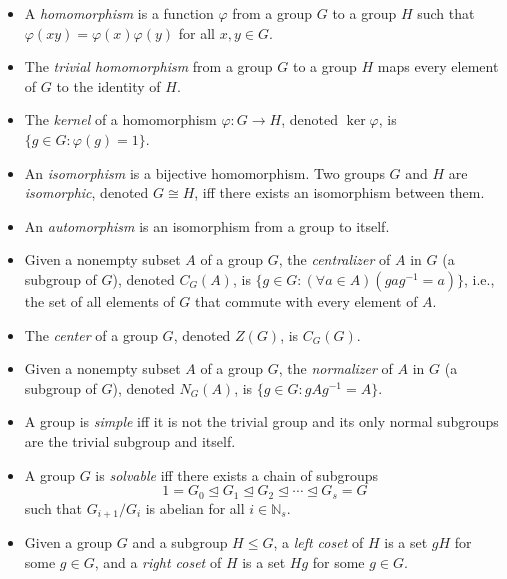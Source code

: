\documentclass{article}
\newcommand{\N}{\mathbb{N}}
\newcommand{\normaleq}{\trianglelefteq}
\begin{document}
\begin{itemize}
\item A \emph{homomorphism} is a function $\varphi$ from a group $G$ to a group $H$ such that $\varphi(xy) = \varphi(x)\varphi(y)$ for all $x,y\in G$.
\item The \emph{trivial homomorphism} from a group $G$ to a group $H$ maps every element of $G$ to the identity of $H$.
\item The \emph{kernel} of a homomorphism $\varphi\colon G\to H$, denoted $\ker\varphi$, is $\{g\in G : \varphi(g) = 1\}$.
\item An \emph{isomorphism} is a bijective homomorphism.  Two groups $G$ and $H$ are \emph{isomorphic}, denoted $G\cong H$, iff there exists an isomorphism between them.
\item An \emph{automorphism} is an isomorphism from a group to itself.

\item Given a nonempty subset $A$ of a group $G$, the \emph{centralizer} of $A$ in $G$ (a subgroup of $G$), denoted $C_G(A)$, is $\{g\in G : (\forall a\in A)(gag^{-1} = a)\}$, i.e., the set of all elements of $G$ that commute with every element of $A$.
\item The \emph{center} of a group $G$, denoted $Z(G)$, is $C_G(G)$.
\item Given a nonempty subset $A$ of a group $G$, the \emph{normalizer} of $A$ in $G$ (a subgroup of $G$), denoted $N_G(A)$, is $\{g\in G : gAg^{-1} = A\}$.
\item A group is \emph{simple} iff it is not the trivial group and its only normal subgroups are the trivial subgroup and itself.
\item A group $G$ is \emph{solvable} iff there exists a chain of subgroups $$1 = G_0\normaleq G_1\normaleq G_2\normaleq\cdots\normaleq G_s = G$$ such that $G_{i+1}/G_i$ is abelian for all $i\in\N_s$.
\item Given a group $G$ and a subgroup $H\leq G$, a \emph{left coset} of $H$ is a set $gH$ for some $g\in G$, and a \emph{right coset} of $H$ is a set $Hg$ for some $g\in G$.


\end{itemize}
\end{document}
